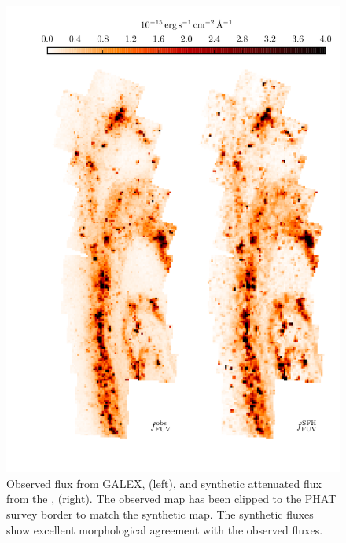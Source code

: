 \documentclass[iop, tighten]{emulateapj}
\begin{document}
\begin{figure}
\centering
\includegraphics[scale=0.9]{m31flux-figures/fluxmaps_fuv.pdf}
\caption[Observed and synthetic attenuated \fuv{} flux maps.]{Observed \fuv{}
    flux from GALEX, \ffuvobs{} (left), and synthetic attenuated \fuv{} flux
    from the , \ffuvsfh{} (right). The observed map has been clipped to
    the PHAT survey border to match the synthetic map. The synthetic fluxes
    show excellent morphological agreement with the observed fluxes.
}
\label{fig:fluxmaps_fuv}
\end{figure}
\end{document}
